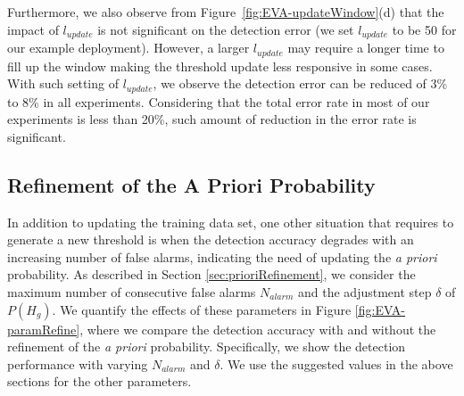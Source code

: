 

Furthermore, we also observe from Figure~\ref{fig:EVA-updateWindow}(d) that the impact of $l_{update}$ is not significant on the detection error
(we set $l_{update}$ to be 50 for our example deployment). However, a larger $l_{update}$ may require a longer time to fill up the window making the threshold update less responsive in some cases. With such setting of $l_{update}$, we observe the detection error can be reduced of 3\% to 8\% in all experiments. Considering that the total error rate in most of our experiments is less than 20\%, such amount of reduction in the error rate is significant. 






\subsection{Refinement of the A Priori Probability}\label{sec:EVA-paramRefine}


In addition to updating the training data set, one other situation that requires to generate a new threshold is when the detection accuracy degrades with an increasing number of false alarms, indicating the need of updating the \textit{a priori} probability. As described in Section \ref{sec:prioriRefinement}, we consider the maximum number of consecutive false alarms $N_{alarm}$ and the adjustment step $\delta$ of $P(H_g)$. We quantify the effects of these parameters in Figure \ref{fig:EVA-paramRefine}, where we compare the detection accuracy with and without the refinement of the \textit{a priori} probability. Specifically, we show the detection performance with varying $N_{alarm}$ and $\delta$. We use the suggested values in the above sections for the other parameters.



